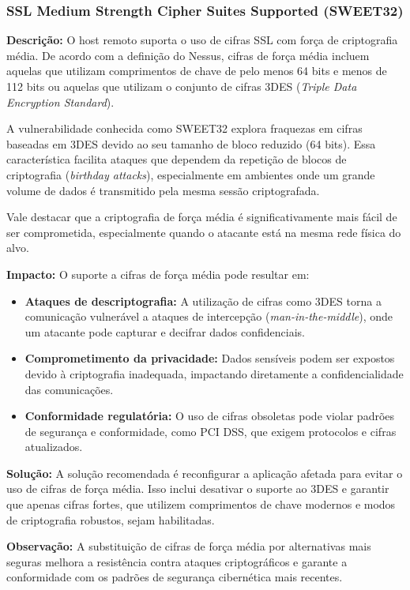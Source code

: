 \documentclass[a4paper,12pt]{article}
\begin{document}
\subsubsection{SSL Medium Strength Cipher Suites Supported (SWEET32)}

\textbf{Descrição:} O host remoto suporta o uso de cifras SSL com força de criptografia média. De acordo com a definição do Nessus, cifras de força média incluem aquelas que utilizam comprimentos de chave de pelo menos 64 bits e menos de 112 bits ou aquelas que utilizam o conjunto de cifras 3DES (\textit{Triple Data Encryption Standard}). 

A vulnerabilidade conhecida como SWEET32 explora fraquezas em cifras baseadas em 3DES devido ao seu tamanho de bloco reduzido (64 bits). Essa característica facilita ataques que dependem da repetição de blocos de criptografia (\textit{birthday attacks}), especialmente em ambientes onde um grande volume de dados é transmitido pela mesma sessão criptografada. 

Vale destacar que a criptografia de força média é significativamente mais fácil de ser comprometida, especialmente quando o atacante está na mesma rede física do alvo.

\textbf{Impacto:} O suporte a cifras de força média pode resultar em:
\begin{itemize}
    \item \textbf{Ataques de descriptografia:} A utilização de cifras como 3DES torna a comunicação vulnerável a ataques de intercepção (\textit{man-in-the-middle}), onde um atacante pode capturar e decifrar dados confidenciais.
    \item \textbf{Comprometimento da privacidade:} Dados sensíveis podem ser expostos devido à criptografia inadequada, impactando diretamente a confidencialidade das comunicações.
    \item \textbf{Conformidade regulatória:} O uso de cifras obsoletas pode violar padrões de segurança e conformidade, como PCI DSS, que exigem protocolos e cifras atualizados.
\end{itemize}

\textbf{Solução:} A solução recomendada é reconfigurar a aplicação afetada para evitar o uso de cifras de força média. Isso inclui desativar o suporte ao 3DES e garantir que apenas cifras fortes, que utilizem comprimentos de chave modernos e modos de criptografia robustos, sejam habilitadas.

\textbf{Observação:} A substituição de cifras de força média por alternativas mais seguras melhora a resistência contra ataques criptográficos e garante a conformidade com os padrões de segurança cibernética mais recentes.
\end{document}
